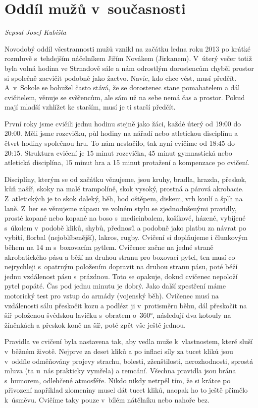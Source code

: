 \documentclass[a5paper, 11pt, twoside]{article}
\begin{document}
\section{Oddíl mužů
v~současnosti}

\textit{Sepsal Josef Kubišta}

Novodobý oddíl všestrannosti mužů vznikl na začátku ledna roku 2013 po
krátké rozmluvě s~tehdejším náčelníkem Jiřím Novákem (Jirkanem). V~úterý
večer totiž byla volná hodina ve Strnadově sále a nám odrostlým
dorostencům chyběl prostor si společně zacvičit podobně jako žactvo.
Navíc, kdo chce vést, musí předčít. A~v~Sokole se bohužel často stává,
že se dorostenec stane pomahatelem a dál cvičitelem, věnuje se
svěřencům, ale sám už na sebe nemá čas a prostor. Pokud mají mladší
vzhlížet ke starším, musí je ti starší předčít.

První roky jsme cvičili jednu hodinu stejně jako žáci, každé úterý od
19:00 do 20:00. Měli jsme rozcvičku, půl hodiny na nářadí nebo
atletickou disciplínu a čtvrt hodiny společnou hru. To nám nestačilo,
tak nyní cvičíme od 18:45 do 20:15. Struktura cvičení je 15 minut
rozcvička, 45 minut gymnastická nebo atletická disciplína, 15 minut hra
a 15 minut protažení a kompenzace po cvičení.

Disciplíny, kterým se od začátku věnujeme, jsou kruhy, bradla, hrazda,
přeskok, kůň našíř, skoky na malé trampolíně, skok vysoký, prostná a
párová akrobacie. Z~atletických je to skok daleký, běh, hod oštěpem,
diskem, vrh koulí a šplh na laně. Z~her se věnujeme zápasu ve volném
stylu se zjednodušenými pravidly, prosté kopané nebo kopané na boso
s~medicinbalem, košíkové, házené, vybíjené s~úkolem v~podobě kliků, shybů,
přednosů a podobně jako platbu za návrat po vybití, florbal
(nejoblíbenější), lakros, rugby. Cvičení si doplňujeme i člunkovým během
na 14 m s~boxovacím pytlem. Cvičenec začne na jedné straně akrobatického
pásu a běží na druhou stranu pro boxovací pytel, ten musí co nejrychleji
s~opatrným položením dopravit na druhou stranu pásu, poté běží jednu
vzdálenost pásu s~prázdnou. Toto se opakuje, dokud cvičenec nepoloží
pytel popáté. Čas pod jednu minutu je dobrý. Jako další zpestření máme
motorický test pro vstup do armády (vojenský běh). Cvičenec musí na
vzdálenosti sálu přeskočit kozu a podlézt ji v~protisměru běhu, dál
přeskočit na šíř položenou švédskou lavičku s~obratem o~360°, následují
dva kotouly na žíněnkách a přeskok koně na šíř, poté zpět vše ještě
jednou.

Pravidla ve cvičení byla nastavena tak, aby vedla muže k~vlastnostem,
které sluší v~běžném životě. Nejprve za deset kliků a po inflaci síly za
tucet kliků jsou v~oddíle odměňovány projevy strachu, bolesti,
zženštilosti, nerozhodnosti, sprostá mluva (ta u~nás prakticky vymřela)
a remcání. Všechna pravidla jsou brána s~humorem, odlehčené atmosféře.
Nikdo nikdy netrpěl tím, že si krátce po přivození například zlomeniny
musel dát tucet kliků, naopak ho to ještě přimělo k~úsměvu. Cvičíme taky
pouze v~bílém nátělníku nebo nahoře bez.
\end{document}
